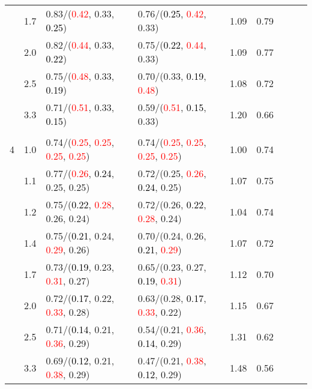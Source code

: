 \documentclass[10pt,a4paper]{report}
\begin{document}
\begin{table}[!htbp]
\begin{center}
{\begin{tabular}{ccllccccc}
			&1.7&0.83/(\textcolor{red}{0.42}, 0.33, \textcolor{black}{0.25})&0.76/(\textcolor{black}{0.25}, \textcolor{red}{0.42}, 0.33)&1.09&0.79\\
			&2.0&0.82/(\textcolor{red}{0.44}, 0.33, \textcolor{black}{0.22})&0.75/(\textcolor{black}{0.22}, \textcolor{red}{0.44}, 0.33)&1.09&0.77\\
			&2.5&0.75/(\textcolor{red}{0.48}, 0.33, \textcolor{black}{0.19})&0.70/(0.33, \textcolor{black}{0.19}, \textcolor{red}{0.48})&1.08&0.72\\
			&3.3&0.71/(\textcolor{red}{0.51}, 0.33, \textcolor{black}{0.15})&0.59/(\textcolor{red}{0.51}, \textcolor{black}{0.15}, 0.33)&1.20&0.66\\
			&&&&\\
			4			&1.0&0.74/(\textcolor{red}{0.25}, \textcolor{red}{0.25}, \textcolor{red}{0.25}, \textcolor{red}{0.25})&0.74/(\textcolor{red}{0.25}, \textcolor{red}{0.25}, \textcolor{red}{0.25}, \textcolor{red}{0.25})&1.00&0.74\\
			&1.1&0.77/(\textcolor{red}{0.26}, \textcolor{black}{0.24}, 0.25, 0.25)&0.72/(0.25, \textcolor{red}{0.26}, \textcolor{black}{0.24}, 0.25)&1.07&0.75\\
			&1.2&0.75/(\textcolor{black}{0.22}, \textcolor{red}{0.28}, 0.26, 0.24)&0.72/(0.26, \textcolor{black}{0.22}, \textcolor{red}{0.28}, 0.24)&1.04&0.74\\
			&1.4&0.75/(\textcolor{black}{0.21}, 0.24, \textcolor{red}{0.29}, 0.26)&0.70/(0.24, 0.26, \textcolor{black}{0.21}, \textcolor{red}{0.29})&1.07&0.72\\
			&1.7&0.73/(\textcolor{black}{0.19}, 0.23, \textcolor{red}{0.31}, 0.27)&0.65/(0.23, 0.27, \textcolor{black}{0.19}, \textcolor{red}{0.31})&1.12&0.70\\
			&2.0&0.72/(\textcolor{black}{0.17}, 0.22, \textcolor{red}{0.33}, 0.28)&0.63/(0.28, \textcolor{black}{0.17}, \textcolor{red}{0.33}, 0.22)&1.15&0.67\\
			&2.5&0.71/(\textcolor{black}{0.14}, 0.21, \textcolor{red}{0.36}, 0.29)&0.54/(0.21, \textcolor{red}{0.36}, \textcolor{black}{0.14}, 0.29)&1.31&0.62\\
			&3.3&0.69/(\textcolor{black}{0.12}, 0.21, \textcolor{red}{0.38}, 0.29)&0.47/(0.21, \textcolor{red}{0.38}, \textcolor{black}{0.12}, 0.29)&1.48&0.56\\
			\bottomrule
		\end{tabular}}
	\end{center}
\end{table}
\end{document}

